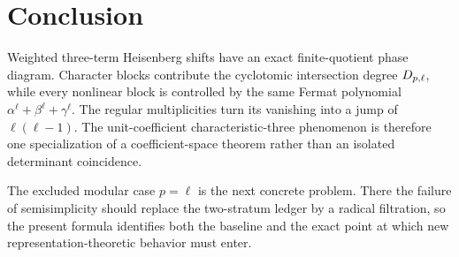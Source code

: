 \section{Conclusion}

Weighted three-term Heisenberg shifts have an exact finite-quotient phase
diagram.  Character blocks contribute the cyclotomic intersection degree
$D_{p,\ell}$, while every nonlinear block is controlled by the same Fermat
polynomial $\alpha^\ell+\beta^\ell+\gamma^\ell$.  The regular multiplicities
turn its vanishing into a jump of $\ell(\ell-1)$.  The unit-coefficient
characteristic-three phenomenon is therefore one specialization of a
coefficient-space theorem rather than an isolated determinant coincidence.

The excluded modular case $p=\ell$ is the next concrete problem.  There the
failure of semisimplicity should replace the two-stratum ledger by a radical
filtration, so the present formula identifies both the baseline and the exact
point at which new representation-theoretic behavior must enter.

